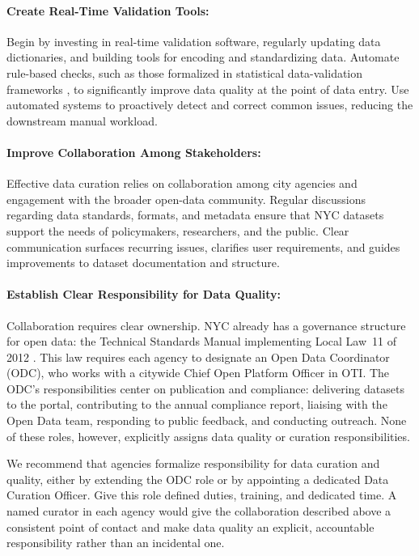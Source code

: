 \documentclass[linenumber]{jdsart}
\begin{document}
\paragraph{Create Real-Time Validation Tools:}
\label{par:realtime}
Begin by investing in real-time validation software, 
regularly updating data dictionaries, and building tools for encoding and 
standardizing data. Automate rule-based checks, such as those formalized in
statistical data-validation frameworks \citep{van2018statistical}, to 
significantly improve data quality at the point of data entry. Use automated 
systems to proactively detect and correct common issues, reducing 
the downstream manual workload.


\paragraph{Improve Collaboration Among Stakeholders:}
\label{par:collaboration}
Effective data curation relies on collaboration among city agencies
and engagement with the broader open-data community. Regular
discussions regarding data standards, formats, and metadata 
ensure that NYC datasets support the needs of policymakers,
researchers, and the public. Clear communication surfaces
recurring issues, clarifies user requirements, and guides improvements
to dataset documentation and structure.

\paragraph{Establish Clear Responsibility for Data Quality:}
\label{par:responsibiliy}
Collaboration requires clear ownership. NYC already has a
governance structure for open data: the Technical Standards Manual
implementing Local Law~11 of 2012 \citep{nyc_ll11, nyc_tsm}. This law 
requires each agency to designate an Open Data Coordinator (ODC), 
who works with a citywide Chief Open Platform Officer in OTI. 
The ODC's responsibilities center on publication and 
compliance: delivering datasets to the portal, 
contributing to the annual compliance report, liaising with the 
Open Data team, responding to public feedback, and conducting 
outreach. None of these roles, however, explicitly assigns 
data quality or curation responsibilities. 

We recommend that agencies formalize responsibility for
data curation and quality, either by extending the ODC role or by appointing a
dedicated Data Curation Officer. Give this role defined duties, training, and 
dedicated time. A named curator in each agency would 
give the collaboration described above a consistent point 
of contact and make data quality an explicit, accountable 
responsibility rather than an incidental one.
\end{document}
